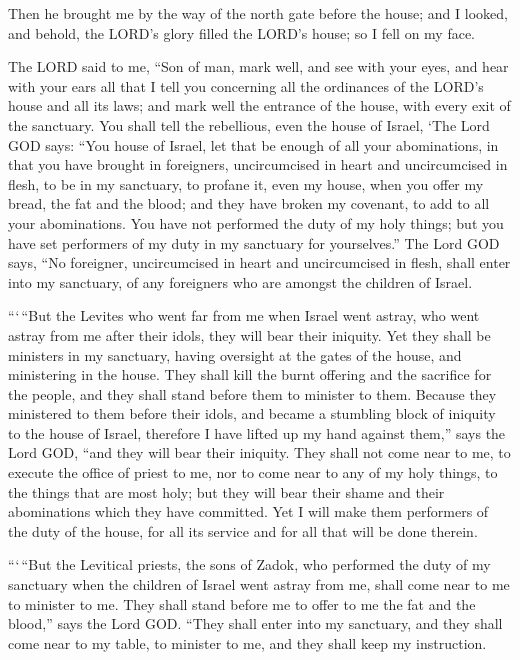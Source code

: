  Then he brought me by the way of the north gate before the
house; and I looked, and behold, the LORD's glory filled the LORD's
house; so I fell on my face.

 The LORD said to me, ``Son of man, mark well, and see with
your eyes, and hear with your ears all that I tell you concerning all
the ordinances of the LORD's house and all its laws; and mark well the
entrance of the house, with every exit of the sanctuary. 
You shall tell the rebellious, even the house of Israel, `The Lord GOD
says: ``You house of Israel, let that be enough of all your
abominations,  in that you have brought in foreigners,
uncircumcised in heart and uncircumcised in flesh, to be in my
sanctuary, to profane it, even my house, when you offer my bread, the
fat and the blood; and they have broken my covenant, to add to all your
abominations.  You have not performed the duty of my holy
things; but you have set performers of my duty in my sanctuary for
yourselves.''  The Lord GOD says, ``No foreigner,
uncircumcised in heart and uncircumcised in flesh, shall enter into my
sanctuary, of any foreigners who are amongst the children of Israel.

 ```\,``But the Levites who went far from me when Israel
went astray, who went astray from me after their idols, they will bear
their iniquity.  Yet they shall be ministers in my
sanctuary, having oversight at the gates of the house, and ministering
in the house. They shall kill the burnt offering and the sacrifice for
the people, and they shall stand before them to minister to them.
 Because they ministered to them before their idols, and
became a stumbling block of iniquity to the house of Israel, therefore I
have lifted up my hand against them,'' says the Lord GOD, ``and they
will bear their iniquity.  They shall not come near to me,
to execute the office of priest to me, nor to come near to any of my
holy things, to the things that are most holy; but they will bear their
shame and their abominations which they have committed. 
Yet I will make them performers of the duty of the house, for all its
service and for all that will be done therein.

 ```\,``But the Levitical priests, the sons of Zadok, who
performed the duty of my sanctuary when the children of Israel went
astray from me, shall come near to me to minister to me. They shall
stand before me to offer to me the fat and the blood,'' says the Lord
GOD.  ``They shall enter into my sanctuary, and they shall
come near to my table, to minister to me, and they shall keep my
instruction.

